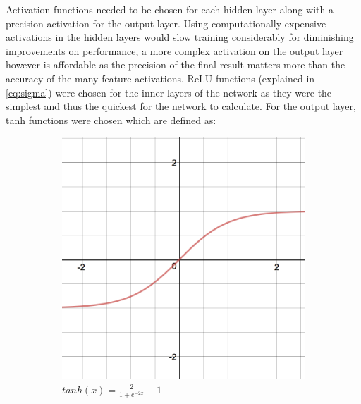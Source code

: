 \documentclass{l4proj}
\begin{document}
Activation functions needed to be chosen for each hidden layer along with a precision activation for the output layer. Using computationally expensive activations in the hidden layers would slow training considerably for diminishing improvements on performance, a more complex activation on the output layer however is affordable as the precision of the final result matters more than the accuracy of the many feature activations. ReLU functions (explained in \ref{eq:sigma}) were chosen for the inner layers of the network as they were the simplest and thus the quickest for the network to calculate. For the output layer, tanh functions were chosen which are defined as:
\begin{figure}[h]
    \centering
    \begin{subfigure}[b]{0.4\textwidth}
        \includegraphics[width=\textwidth]{images/tanh.PNG}
        \caption{$tanh(x) = \frac{2}{1+e^{-2x}}-1$}
    \end{subfigure}
    \quad
    \begin{subfigure}[b]{0.4\textwidth}

\end{subfigure}
\end{figure}
\end{document}
